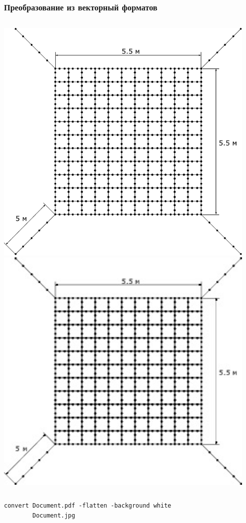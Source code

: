 \documentclass[11pt, compress]{beamer}
\begin{document}
\begin{frame}[c, fragile]
\frametitle{Преобразование из векторный форматов}
\begin{columns}
\includegraphics[width=0.95\textwidth]{net.pdf}
\includegraphics[width=0.95\textwidth]{net.jpg}
\end{columns}  
\vfill
\begin{lstlisting}
convert Document.pdf -flatten -background white 
        Document.jpg
\end{lstlisting}
\end{frame}
\end{document}
